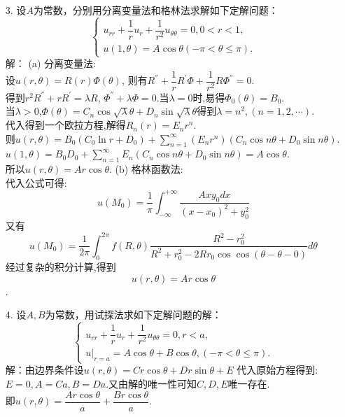 \documentclass[11pt]{article}
\begin{document}
\begin{enumerate}
    \item[3.] 设$A$为常数，分别用分离变量法和格林法求解如下定解问题：
       \begin{equation*}
    \left\{
     \begin{array}{lr}
     u_{rr}+\dfrac{1}{r}u_r+\dfrac{1}{r^2}u_{\theta\theta}=0,  0<r<1,\\u(1,\theta)=A\cos\theta (-\pi<\theta\leq \pi).
     \end{array}
    \right.
    \end{equation*}
        解： \subitem(a) 分离变量法:\\
        设$u(r,\theta)=R(r)\Phi(\theta)$, 则有$R^{''}+\dfrac{1}{r}R^{'}\Phi+\dfrac{1}{r^2}R\Phi^{''}=0$.
        \\得到$r^{2}R^{''}+rR^{'}=\lambda R$, $\Phi^{''}+\lambda \Phi=0$.当$\lambda=0$时,易得$\Phi_0(\theta)=B_0$.
        \\当$\lambda>0$,$\Phi(\theta)=C_n\cos\sqrt {\lambda}\theta+D_n\sin\sqrt {\lambda}\theta $得到$\lambda=n^2,(n=1,2,\cdots)$.
        \\代入得到一个欧拉方程,解得$R_n(r)=E_n r^n$.
        \\则$u(r,\theta)=B_0(C_0\ln r +D_0)+\displaystyle\sum_{n=1}^{\infty}(E_n r^n)(C_n\cos n\theta+D_0\sin n\theta) $.
        \\$u(1,\theta)=B_0 D_0+\displaystyle\sum_{n=1}^{\infty}E_n(C_n\cos n\theta+D_0\sin n\theta)=A\cos\theta$.
        \\所以$u(r,\theta)=Ar\cos\theta.$
        \subitem(b) 格林函数法:\\
        代入公式可得:\[u(M_0)=\dfrac{1}{\pi}\displaystyle\int_{-\infty}^{+\infty}\dfrac{Axy_0 dx}{(x-x_0)^2 +y_0 ^2}\]
        又有\[u(M_0)=\dfrac{1}{2\pi}\displaystyle\int_{0}^{2\pi}f(R,\theta)\dfrac{R^2-r_0^2}{R^2+r_0^2-2Rr_0 \cos \cos(\theta-\theta-0)}d\theta\]
        经过复杂的积分计算,得到\[u(r,\theta)=Ar\cos\theta\].



    \item[4.] 设$A,B$为常数，用试探法求如下定解问题的解：
       \begin{equation*}
    \left\{
     \begin{array}{lr}
     u_{rr}+\dfrac{1}{r}u_r+\dfrac{1}{r^2}u_{\theta\theta}=0,  r<a,\\u|_{r=a}=A\cos\theta + B\cos\theta,(-\pi<\theta\leq \pi).
     \end{array}
    \right.
    \end{equation*}
        解：由边界条件设$u(r,\theta)=Cr\cos\theta+Dr\sin\theta+E$
        代入原始方程得到:$E=0,A=Ca,B=Da$.又由解的唯一性可知$C,D,E$唯一存在.
    \\[8pt] 即$u(r,\theta)=\dfrac{Ar\cos\theta}{a}+\dfrac{Br\cos\theta}{a}$.


    \end{enumerate}
\end{document}
